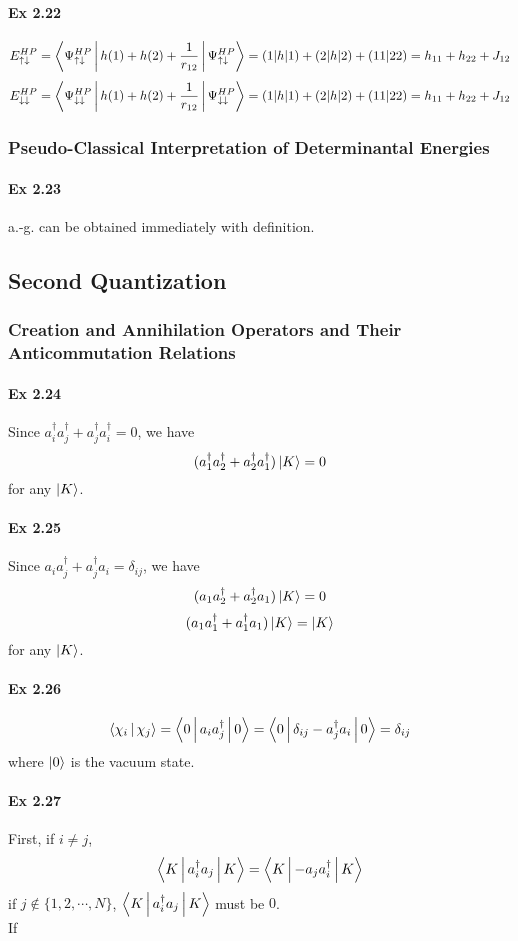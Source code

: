 \documentclass[a4paper]{article}
\newcommand{\ex}[1]{\paragraph{Ex #1}}
\numberwithin{equation}{subsection}
\begin{document}
\ex{2.22}
\begin{equation}\label{key}
E_{\uparrow\downarrow}^{HP} = \Braket{\Psi_{\uparrow\downarrow}^{HP} | h(1) + h(2) + \dfrac{1}{r_{12}} | \Psi_{\uparrow\downarrow}^{HP}} = (1|h|1)+(2|h|2)+(11|22) = h_{11}+h_{22}+J_{12}
\end{equation}
\begin{equation}\label{key}
E_{\downarrow\downarrow}^{HP} = \Braket{\Psi_{\downarrow\downarrow}^{HP} | h(1) + h(2) + \dfrac{1}{r_{12}} | \Psi_{\downarrow\downarrow}^{HP}} = (1|h|1)+(2|h|2)+(11|22) = h_{11}+h_{22}+J_{12}
\end{equation}

\subsubsection{Pseudo-Classical Interpretation of Determinantal Energies}
\ex{2.23}
a.-g. can be obtained immediately with definition.

\subsection{Second Quantization}
\subsubsection{Creation and Annihilation Operators and Their Anticommutation Relations}
\ex{2.24}
Since $ a_i^\dagger a_j^\dagger + a_j^\dagger a_i^\dagger = 0 $, we have
\begin{equation}\label{key}
(a_1^\dagger a_2^\dagger + a_2^\dagger a_1^\dagger)\ket{K} = 0
\end{equation}
for any $ \ket{K} $.

\ex{2.25}
Since $ a_i a_j^\dagger + a_j^\dagger a_i = \delta_{ij} $, we have
\begin{equation}\label{key}
(a_1 a_2^\dagger + a_2^\dagger a_1)\ket{K} = 0
\end{equation}
\begin{equation}\label{key}
(a_1 a_1^\dagger + a_1^\dagger a_1)\ket{K} = \ket{K}
\end{equation}
for any $ \ket{K} $.

\ex{2.26}
\begin{equation}\label{key}
\Braket{\chi_i|\chi_j} = \Braket{0 | a_i a_j^\dagger | 0} = \Braket{0 | \delta_{ij} - a_j^\dagger a_i | 0} = \delta_{ij}
\end{equation}
where $ \ket{0} $ is the vacuum state.

\ex{2.27}
First, if $ i\neq j $,
\begin{equation}\label{key}
\Braket{K | a_i^\dagger a_j | K} = \Braket{K | - a_j a_i^\dagger  | K}
\end{equation}
if $ j\notin \{1,2,\cdots,N\} $, $ \Braket{K | a_i^\dagger a_j | K} $ must be $ 0 $.\\
If 
\end{document}
